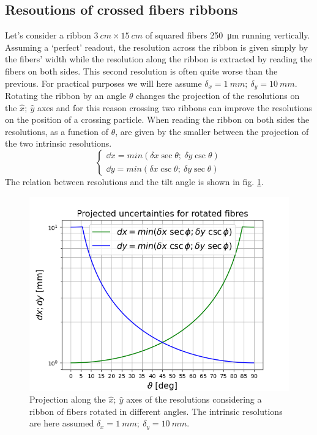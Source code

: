 \begin{refsection}
\subsection{Resoutions of crossed fibers ribbons}
Let's consider a ribbon  $\SI{3}{cm}\times\SI{15}{cm}$ of squared fibers \SI{250}{\micro m} running vertically. Assuming a `perfect' readout, the resolution across the ribbon is given simply by the fibers' width while the resolution along the ribbon is extracted by reading the fibers on both sides. This second resolution is often quite worse than the previous. For practical purposes we will here assume $\delta_x = \SI{1}{mm};\ \delta_y = \SI{10}{mm}$.
Rotating the ribbon by an angle $\theta$ changes the projection of the resolutions on the $\hat{x};\ \hat{y}$ axes and for this reason crossing two ribbons can improve the resolutions on the position of a crossing particle.
\noindent
When reading the ribbon on both sides the resolutions, as a function of $\theta$, are given by the smaller between the projection of the two intrinsic resolutions.  
\begin{equation}
    \begin{cases}
      \dd x = min(\delta x \sec \theta;\ \delta y \csc \theta)\\
      \dd y = min(\delta x \csc \theta;\ \delta y \sec \theta)
    \end{cases}
\end{equation}
The relation between resolutions and the tilt angle is shown in fig. \ref{fig:CyFi:projected_dxdy}.  

\begin{figure}
    \centering
    \includegraphics[width=\textwidth]{Figures/muEDM/CyFi/projected_dxdy.png}
    \caption{Projection along the $\hat{x};\ \hat{y}$ axes of the resolutions considering a ribbon of fibers rotated in different angles. The intrinsic resolutions are here assumed $\delta_x = \SI{1}{mm};\ \delta_y = \SI{10}{mm}$.}
    \label{fig:CyFi:projected_dxdy}
\end{figure}



\end{refsection}
